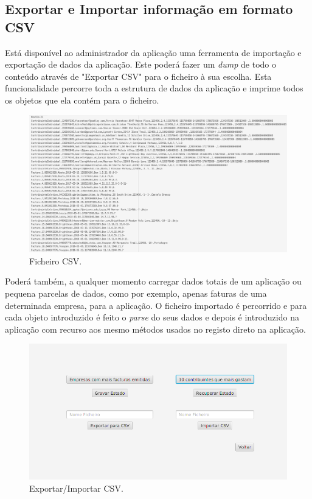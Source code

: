 \documentclass[a4paper]{article}
\begin{document}
\subsection{Exportar e Importar informação em formato CSV}
\label{sec:csv}

Está disponível ao administrador da aplicação uma ferramenta de importação e
exportação de dados da aplicação. Este poderá fazer um \textit{dump} de todo o
conteúdo através de "Exportar CSV" para o ficheiro à sua escolha. Esta
funcionalidade percorre toda a estrutura de dados da aplicação e imprime todos
os objetos que ela contém para o ficheiro.

\begin{figure}[H]
\centering
\includegraphics[scale=0.35]{imgs/csv.png}
\caption{Ficheiro CSV.}
\label{img:csvfile}
\end{figure}

Poderá também, a qualquer momento carregar dados totais de um aplicação ou
pequena parcelas de dados, como por exemplo, apenas faturas de uma determinada
empresa, para a aplicação. O ficheiro importado é percorrido e para cada
objeto introduzido é feito o \textit{parse} do seus dados e depois é introduzido
na aplicação com recurso aos mesmo métodos usados no registo direto na
aplicação.

\begin{figure}[H]
\centering
\includegraphics[scale=0.35]{imgs/dashboardadmin.png}
\caption{Exportar/Importar CSV.}
\label{img:csv}
\end{figure}
\end{document}
